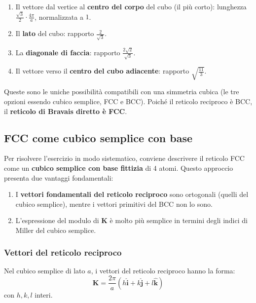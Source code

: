 \begin{enumerate}
    \item Il vettore dal vertice al \textbf{centro del corpo} del cubo (il più corto): lunghezza $\frac{\sqrt{3}}{2} \cdot \frac{4\pi}{a}$, normalizzata a $1$.
    \item Il \textbf{lato} del cubo: rapporto $\frac{2}{\sqrt{3}}$.
    \item La \textbf{diagonale di faccia}: rapporto $\frac{2\sqrt{2}}{\sqrt{3}}$.
    \item Il vettore verso il \textbf{centro del cubo adiacente}: rapporto $\sqrt{\frac{11}{3}}$.
\end{enumerate}

Queste sono le uniche possibilità compatibili con una simmetria cubica (le tre opzioni essendo cubico semplice, FCC e BCC). Poiché il reticolo reciproco è BCC, il \textbf{reticolo di Bravais diretto è FCC}.

\subsection{FCC come cubico semplice con base}



Per risolvere l'esercizio in modo sistematico, conviene descrivere il reticolo FCC come un \textbf{cubico semplice con base fittizia} di 4 atomi. Questo approccio presenta due vantaggi fondamentali:

\begin{enumerate}
    \item I \textbf{vettori fondamentali del reticolo reciproco} sono ortogonali (quelli del cubico semplice), mentre i vettori primitivi del BCC non lo sono.
    \item L'espressione del modulo di $\mathbf{K}$ è molto più semplice in termini degli indici di Miller del cubico semplice.
\end{enumerate}

\subsubsection{Vettori del reticolo reciproco}

Nel cubico semplice di lato $a$, i vettori del reticolo reciproco hanno la forma:
\begin{equation}
\mathbf{K} = \frac{2\pi}{a}\left(h\hat{\mathbf{i}} + k\hat{\mathbf{j}} + l\hat{\mathbf{k}}\right)
\end{equation}
con $h, k, l$ interi.

